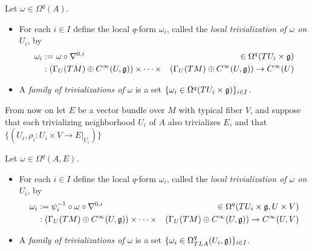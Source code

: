 \begin{definition}\label{definitionLocalTrivializationOfScalarValuedForms}
Let $\omega \in \Omega^q(A)$.
    \begin{itemize}
    
    \item For each $i \in I$ define the local $q$-form $\omega_i$, called the \emph{local trivialization of $\omega$ on $U_i$}, by
    \begin{align}
        \omega_i &:= \omega \circ \nabla^{0, i}  & \in \Omega^q(TU_i\times \mathfrak{g})\\
        &:\left( \Gamma_U(TM)\oplus C^\infty(U, \mathfrak{g}) \right) \times \cdots \times &\left( \Gamma_U(TM)\oplus C^\infty(U, \mathfrak{g}) \right) \to C^\infty(U)
    \end{align}
    
    \item A \emph{family of trivializations of $\omega$} is a set $\{\omega_i \in \Omega^q(TU_i \times \mathfrak{g})\}_{i \in I}$.
    
    \end{itemize}

\end{definition}

From now on let $E$ be a vector bundle over $M$ with typical fiber $V$, and suppose that each trivializing neighborhood $U_i$ of $A$ also trivializes $E$, and that $\{(U_i, \rho_i: U_i \times V \to E|_{U_i})\}$

\begin{definition}\label{definitionLocalTrivializationOfEValuedForms}
Let $\omega \in \Omega^q(A, E)$.
    \begin{itemize}
    
    \item For each $i \in I$ define the local $q$-form $\omega_i$, called the \emph{local trivialization of $\omega$ on $U_i$}, by
    \begin{align}
        \omega_i &:= \psi_i^{-1} \circ \omega \circ \nabla^{0, i}  & \in \Omega^q(TU_i\times \mathfrak{g}, U \times V)\\
        &:\left( \Gamma_U(TM)\oplus C^\infty(U, \mathfrak{g}) \right) \times \cdots \times &\left( \Gamma_U(TM)\oplus C^\infty(U, \mathfrak{g}) \right) \to C^\infty(U, V)
    \end{align}
    
    \item A \emph{family of trivializations of $\omega$} is a set $\{\omega_i \in \Omega^q_{TLA}(U_i, \mathfrak{g})\}_{i \in I}$.
    
    \end{itemize}

\end{definition}

